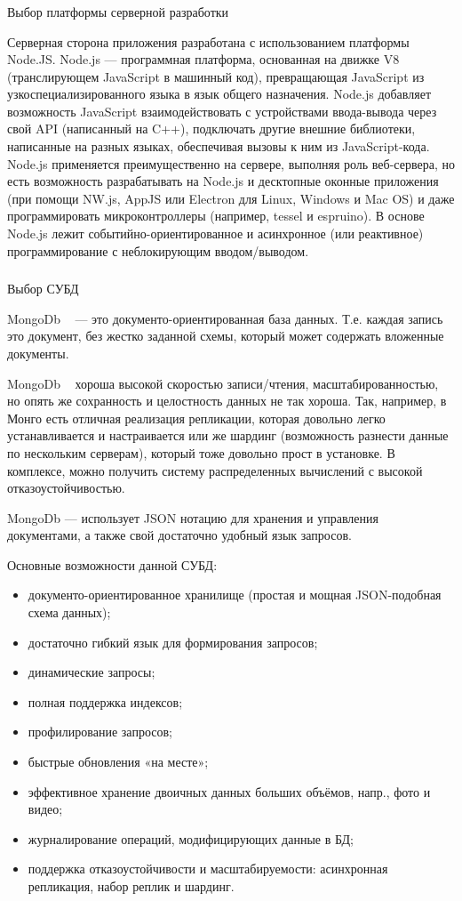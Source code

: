 \subsubsection{}Выбор платформы серверной разработки

Серверная сторона приложения разработана с использованием платформы Node.JS.
Node.js — программная платформа, основанная на движке V8 (транслирующем JavaScript в машинный код), превращающая JavaScript из узкоспециализированного языка в язык общего назначения. Node.js добавляет возможность JavaScript взаимодействовать с устройствами ввода-вывода через свой API (написанный на C++), подключать другие внешние библиотеки, написанные на разных языках, обеспечивая вызовы к ним из JavaScript-кода. Node.js применяется преимущественно на сервере, выполняя роль веб-сервера, но есть возможность разрабатывать на Node.js и десктопные оконные приложения (при помощи NW.js, AppJS или Electron для Linux, Windows и Mac OS) и даже программировать микроконтроллеры (например, tessel и espruino). В основе Node.js лежит событийно-ориентированное и асинхронное (или реактивное) программирование с неблокирующим вводом/выводом.

\subsubsection{}Выбор СУБД

MongoDb ~\cite{mongodb} — это документо-ориентированная база данных. Т.е. каждая запись это документ, без жестко заданной схемы, который может содержать вложенные документы.

MongoDb ~\cite{mongodb} хороша высокой скоростью записи/чтения, масштабированностью, но опять же сохранность и целостность данных не так хороша. Так, например, в Монго есть отличная реализация репликации, которая довольно легко устанавливается и настраивается или же шардинг (возможность разнести данные по нескольким серверам), который тоже довольно прост в установке. В комплексе, можно получить систему распределенных вычислений с высокой отказоустойчивостью.

MongoDb — использует JSON нотацию для хранения и управления документами, а также свой достаточно удобный язык запросов.

Основные возможности данной СУБД:
\begin{itemize}
  \item документо-ориентированное хранилище (простая и мощная JSON-подобная схема данных);
  \item достаточно гибкий язык для формирования запросов;
  \item динамические запросы;
  \item полная поддержка индексов;
  \item профилирование запросов;
  \item быстрые обновления «на месте»;
  \item эффективное хранение двоичных данных больших объёмов, напр., фото и видео;
  \item журналирование операций, модифицирующих данные в БД;
  \item поддержка отказоустойчивости и масштабируемости: асинхронная репликация, набор реплик и шардинг.
\end{itemize}

